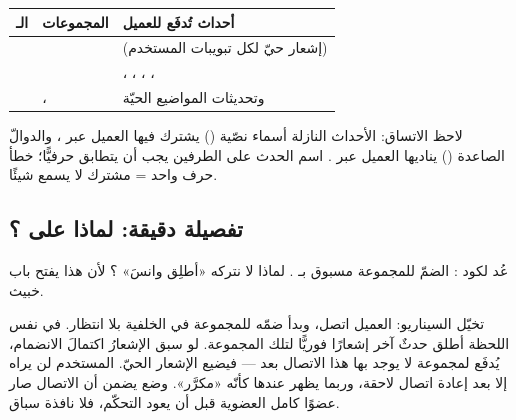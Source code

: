 \begin{center}
\begin{tabular}{L{2.9cm} L{3.9cm} L{5.2cm}}
\toprule
{\color{spPrimary}الـ } & {\color{spPrimary}المجموعات} & {\color{spPrimary}أحداث تُدفَع للعميل} \\
\midrule
{}\newline {} &  &
 (إشعار حيّ لكل تبويبات المستخدم) \\
\newline {} &  &
، ، ،
،  \\
\newline {} & ،
 &  وتحديثات المواضيع الحيّة \\
\bottomrule
\end{tabular}
\end{center}

\begin{note}
لاحظ الاتساق: الأحداث النازلة أسماء نصّية () يشترك فيها
العميل عبر ، والدوالّ الصاعدة () يناديها العميل
عبر . اسم الحدث على الطرفين يجب أن يتطابق حرفيًّا؛ خطأ حرف واحد =
مشترك لا يسمع شيئًا.
\end{note}

\subsection{تفصيلة دقيقة: لماذا  على ؟}

عُد لكود : الضمّ للمجموعة مسبوق بـ
. لماذا لا نتركه «أطلِق وانسَ» ؟ لأن هذا يفتح
باب  خبيث.

\begin{qa}
تخيّل السيناريو: العميل اتصل، وبدأ ضمّه للمجموعة  في الخلفية بلا
انتظار. في نفس اللحظة أطلق حدثٌ آخر إشعارًا فوريًّا لتلك المجموعة. لو سبق الإشعارُ
اكتمالَ الانضمام، يُدفَع لمجموعة لا يوجد بها هذا الاتصال بعد — فيضيع
الإشعار الحيّ. المستخدم لن يراه إلا بعد إعادة اتصال لاحقة، وربما يظهر عندها كأنّه
«مكرَّر». وضع  يضمن أن الاتصال صار عضوًا كامل العضوية قبل أن
يعود التحكّم، فلا نافذة سباق.
\end{qa}

